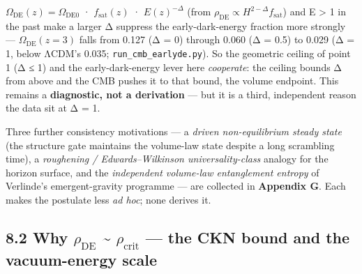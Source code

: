 \documentclass[
  10pt,
]{article}
\begin{document}
\begin{enumerate}
  \(\Omega _{\mathrm{DE}}(z) = \Omega _{\mathrm{DE0}}\) ·
  \(f_{\mathrm{sat}}(z)\) · \(E(z)^{-\Delta }\) (from
  \(\rho _{\mathrm{DE}} \propto  H^{2-\Delta }f_{\mathrm{sat}}\)) and E
  \textgreater{} 1 in the past make a larger Δ suppress the
  early-dark-energy fraction more strongly ---
  \(\Omega _{\mathrm{DE}}(z = 3)\) falls from 0.127 (Δ = 0) through
  0.060 (Δ = 0.5) to 0.029 (Δ = 1, below ΛCDM's 0.035;
  \texttt{run\_cmb\_earlyde.py}). So the geometric ceiling of point 1 (Δ
  ≤ 1) and the early-dark-energy lever here \emph{cooperate}: the
  ceiling bounds Δ from above and the CMB pushes it to that bound, the
  volume endpoint. This remains a \textbf{diagnostic, not a derivation}
  --- but it is a third, independent reason the data sit at Δ = 1.
\end{enumerate}

Three further consistency motivations --- a \emph{driven non-equilibrium
steady state} (the structure gate maintains the volume-law state despite
a long scrambling time), a \emph{roughening / Edwards--Wilkinson
universality-class} analogy for the horizon surface, and the
\emph{independent volume-law entanglement entropy} of Verlinde's
emergent-gravity programme --- are collected in \textbf{Appendix G}.
Each makes the postulate less \emph{ad hoc}; none derives it.

\subsection{\texorpdfstring{8.2 Why \(\rho _{\mathrm{DE}}\)
\textasciitilde{} \(\rho _{\mathrm{crit}}\) --- the CKN bound and the
vacuum-energy
scale}{8.2 Why \textbackslash rho \_\{\textbackslash mathrm\{DE\}\} \textasciitilde{} \textbackslash rho \_\{\textbackslash mathrm\{crit\}\} --- the CKN bound and the vacuum-energy scale}}\label{why-rho-_mathrmde-rho-_mathrmcrit-the-ckn-bound-and-the-vacuum-energy-scale}
\end{document}
